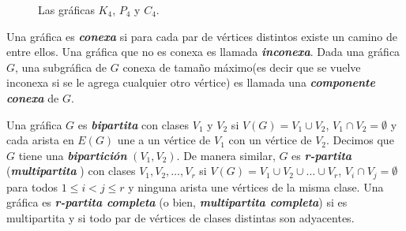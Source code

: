 \begin{figure}[!htbp]
\centering

\caption{Las gráficas $K_4$, $P_4$ y $C_4$.}
\label{fig_tipos_graficas}
\end{figure}

Una gráfica es \textbf{\emph{conexa}} si para cada par de vértices distintos existe un camino de entre ellos. Una gráfica que no es conexa es llamada \textbf{\emph{inconexa}}. Dada una gráfica $G$, una subgráfica de $G$ conexa de tamaño máximo(es decir que se vuelve inconexa si se le agrega cualquier otro vértice) es llamada una \textbf{\emph{componente conexa}} de $G$.

Una gráfica $G$ es \textbf{\emph{bipartita}} con clases $V_1$ y $V_2$ si $V(G) = V_1 \cup V_2$, $V_1 \cap V_2 = \emptyset$ y cada arista en $E(G)$ une a un vértice de $V_1$ con un vértice de $V_2$. Decimos que $G$ tiene una \textbf{\emph{bipartición}} $(V_1,V_2)$. De manera similar, $G$ es \textbf{\emph{r-partita}} (\textbf{\emph{multipartita}} ) con clases $V_1, V_2, \dots, V_r$ si $V(G) = V_1 \cup V_2 \cup \dots \cup V_r$, $V_i \cap V_j = \emptyset$ para todos $1\leq i < j \leq r$ y ninguna arista une vértices de la misma clase. Una gráfica es \textbf{\emph{r-partita completa}} (o bien, \textbf{\emph{multipartita completa}}) si es multipartita y si todo par de vértices de clases distintas son adyacentes.


